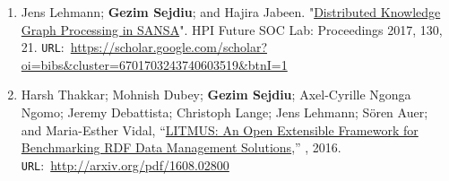 \begin{itemize}
\begin{enumerate}
    \item Jens Lehmann; \textbf{Gezim Sejdiu}; and Hajira Jabeen. "\href{https://scholar.google.com/scholar?oi=bibs&cluster=6701703243740603519&btnI=1}{Distributed Knowledge Graph Processing in SANSA}". HPI Future SOC Lab: Proceedings 2017, 130, 21.
    \texttt{URL}:~\url{https://scholar.google.com/scholar?oi=bibs&cluster=6701703243740603519&btnI=1}

    \item Harsh Thakkar; Mohnish Dubey; \textbf{Gezim Sejdiu}; Axel-Cyrille Ngonga Ngomo; Jeremy Debattista; Christoph Lange; Jens Lehmann; Sören Auer; and Maria-Esther Vidal, “\href{http://arxiv.org/pdf/1608.02800}{LITMUS: An Open Extensible Framework for Benchmarking RDF Data Management Solutions},” , 2016. \texttt{URL}:~\url{http://arxiv.org/pdf/1608.02800}

\end{enumerate}

\end{itemize}